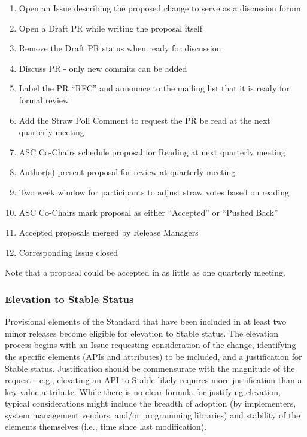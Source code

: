 \documentclass{article}
\providecommand{\tightlist}{%
  \setlength{\itemsep}{0pt}\setlength{\parskip}{0pt}}
\begin{document}
\begin{enumerate}
\def\labelenumi{\arabic{enumi}.}
\tightlist
\item
  Open an Issue describing the proposed change to serve as a discussion
  forum
\item
  Open a Draft PR while writing the proposal itself
\item
  Remove the Draft PR status when ready for discussion
\item
  Discuss PR - only new commits can be added
\item
  Label the PR ``RFC'' and announce to the mailing list that it is ready
  for formal review
\item
  Add the Straw Poll Comment to request the PR be read at the
  next quarterly meeting
\item
  ASC Co-Chairs schedule proposal for Reading at next quarterly
  meeting
\item
  Author(s) present proposal for review at quarterly meeting
\item
  Two week window for participants to adjust straw votes based on
  reading
\item
  ASC Co-Chairs mark proposal as either ``Accepted'' or ``Pushed Back''
\item
  Accepted proposals merged by Release Managers
\item
  Corresponding Issue closed
\end{enumerate}

Note that a proposal could be accepted in as little as one quarterly
meeting.

\hypertarget{elevation-to-stable-status}{%
\subsubsection{Elevation to Stable Status}%
\label{elevation-to-stable-status}}

Provisional elements of the Standard that have been included in at least
two minor releases become eligible for elevation to Stable
status. The elevation process begins with an Issue requesting
consideration of the change, identifying the specific elements (APIs and
attributes) to be included, and a justification for Stable status.
Justification should be commensurate with the magnitude of the request -
e.g., elevating an API to Stable likely requires more justification
than a key-value attribute. While there is no clear formula for
justifying elevation, typical considerations might include the breadth
of adoption (by implementers, system management vendors, and/or
programming libraries) and stability of the elements themselves (i.e.,
time since last modification).
\end{document}
